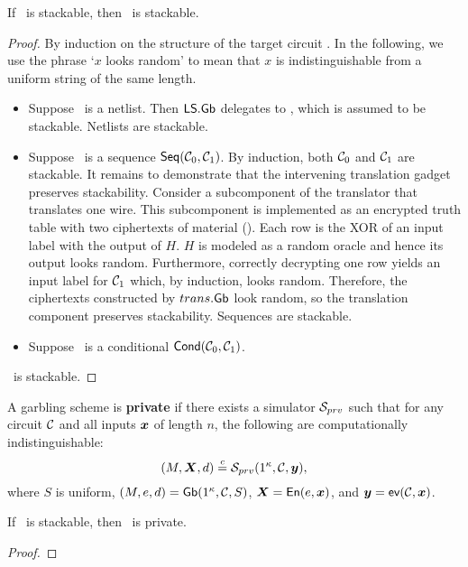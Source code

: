 \begin{theorem}
  If \underscheme\ is stackable, then \ourscheme\ is stackable.
\end{theorem}
\begin{proof}
  By induction on the structure of the target circuit \cir.
  In the following, we use the phrase `$x$ looks random' to mean that $x$ is indistinguishable from a uniform string of the same length.
  \begin{itemize}
    \item Suppose \cir\ is a netlist.
      Then $\textsf{LS}.\textsf{Gb}$ delegates to \underscheme,
      which is assumed to be stackable.
      Netlists are stackable.
    \item Suppose \cir\ is a sequence $\textsf{Seq}(\mathcal C_0, \mathcal C_1)$.
      By induction,
      both $\mathcal C_0$ and $\mathcal C_1$ are stackable.
      It remains to demonstrate that the intervening translation
      gadget preserves stackability.
      Consider a subcomponent of the translator that translates one wire.
      This subcomponent is implemented as an encrypted truth table with two ciphertexts of material ().
      Each row is the XOR of an input label with the
      output of $H$. $H$ is modeled as a random oracle and hence its output looks random.
      Furthermore, correctly decrypting one row yields an
      input label for $\mathcal C_1$ which, by induction, looks random.
      Therefore, the ciphertexts constructed by $trans.\textsf{Gb}$
      look random, so the translation component preserves stackability.
      Sequences are stackable.
    \item Suppose \cir\ is a conditional $\textsf{Cond}(\mathcal C_0, \mathcal C_1)$.
  \end{itemize}
  \ourscheme\ is stackable.
\end{proof}

\begin{definition}[Privacy]\label{def:privacy}
  A garbling scheme is \textbf{private} if
  there exists a simulator $\mathcal{S}_{prv}$ such that for
  any circuit $\mathcal C$
  and all inputs $\cirinp$ of length $n$,
  the following are computationally indistinguishable:
   \[
  (\mat, \gcirinp, d)
  \indist
  \simulator_{prv}(1^\kappa, \cir, \cirout),
  \]
  where
  $S$ is uniform,
   $(M, e, d) = \textsf{Gb}(1^\kappa,\mathcal C,S)$,
  $\gcirinp = \gEn(e,\cirinp)$,
  and $\cirout = \gev(\cir,\cirinp)$. 
\end{definition}

\begin{theorem}
  If \underscheme\ is stackable, then \ourscheme\ is private.
\end{theorem}
\begin{proof}
\end{proof}

